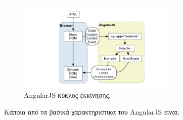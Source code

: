 	  \begin{figure}[h]
	    \centering
	    \includegraphics[width=0.7\textwidth]{angularjs.png}
	    \caption{AngularJS κύκλος εκκίνησης.}
	    \label{fig:angularjs}
	\end{figure}

	Κάποια από τα βασικά χαρακτηριστικά του AngularJS είναι:
